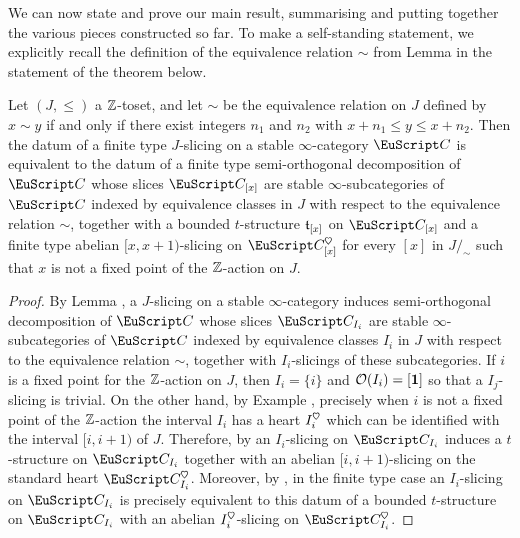 {We can now state and prove our main result, summarising and putting together the various pieces constructed so far. To make a self-standing statement, we explicitly recall the definition of the equivalence relation $\sim$ from Lemma  in the statement of the theorem below.
\begin{theorem}\label{conclusion}
Let $(J,\leq)$ a $\mathbb{Z}$-toset, and let $\sim$ be the equivalence relation on $J$ defined by $x\sim y$ if and only if there exist integers $n_1$ and $n_2$ with $x+n_1\leq y\leq x+n_2$. Then the datum of a finite type $J$-slicing on a stable $\infty$-category $\C$ is equivalent to the datum of a finite type semi-orthogonal decomposition of $\C$ whose slices $\C_{[x]}$ are stable  $\infty$-subcategories of $\C$ indexed by equivalence classes in $J$ with respect to the equivalence relation $\sim$, together with a bounded $t$-structure $\mathfrak{t}_{[x]}$ on $\C_{[x]}$ and a finite type abelian $[x,x+1)$-slicing on $\C_{[x]}^\heart$ for every $[x]$ in $J/_{\!\sim}$ such that $x$ is not a fixed point of the $\mathbb{Z}$-action on $J$.
\end{theorem}
\begin{proof}
By Lemma , a $J$-slicing on a stable $\infty$-category induces semi-orthogonal decomposition of $\C$ whose slices $\C_{I_i}$ are stable  $\infty$-subcategories of $\C$ indexed by equivalence classes $I_i$ in $J$ with respect to the equivalence relation $\sim$, together with $I_i$-slicings of these subcategories.
If $i$ is a fixed point for the $\mathbb{Z}$-action on $J$, then $I_i=\{i\}$ and $\mathcal{O}(I_i)=[\mathbf{1}]$ so that a $I_j$-slicing is trivial. On the other hand, by Example , precisely when $i$ is not a fixed point of the $\mathbb{Z}$-action the interval $I_i$ has a heart $I_i^\heart$ which can be identified with the interval $[i,i+1)$ of $J$. Therefore, by \aprop{} an $I_i$-slicing on $\C_{I_i}$ induces a $t$-structure on $\C_{I_i}$ together with an abelian $[i,i+1)$-slicing on the standard heart $\C_{I_i}^\heart$. Moreover, by \aprop{}, in the finite type case an $I_i$-slicing on $\C_{I_i}$ is precisely equivalent to this datum of a bounded $t$-structure on $\C_{I_i}$ with an abelian $I_i^\heart$-slicing on $\C_{I_i}^\heart$. 
\end{proof}
}








